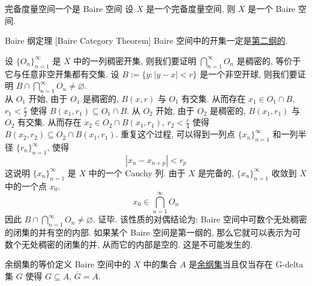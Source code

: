         \begin{thm}
            {完备度量空间一个是 Baire 空间}
            设 \(X\) 是一个完备度量空间, 则 \(X\) 是一个 Baire 空间.
        \end{thm}

        \begin{thm}
            [bct]
            {Baire 纲定理}
            [Baire Category Theorem]
            Baire 空间中的开集一定是\hyperref[dfn:second-category]{第二纲的}.
        \end{thm}

        \begin{prf}
            设 \(\{O_n\}_{n=1}^{\infty}\) 是 \(X\) 中的一列稠密开集, 则我们要证明 \(\bigcap_{n=1}^{\infty} O_n\) 是稠密的, 等价于它与任意非空开集都有交集. 设 \(B:=\{y:|y-x|<r\}\) 是一个非空开球, 则我们要证明 \(B\cap \bigcap_{n=1}^{\infty} O_n\neq \varnothing\). \\
            从 \(O_1\) 开始, 由于 \(O_1\) 是稠密的, \(B(x,r)\) 与 \(O_1\) 有交集. 从而存在 \(x_1\in O_1\cap B\), \(r_1<\frac{r}{2}\) 使得 \(B(x_1,r_1)\subseteq O_1\cap B\). 从 \(O_2\) 开始, 由于 \(O_2\) 是稠密的, \(B(x_1,r_1)\) 与 \(O_2\) 有交集. 从而存在 \(x_2\in O_2\cap B(x_1,r_1)\), \(r_2<\frac{r}{4}\) 使得 \(B(x_2,r_2)\subseteq O_2\cap B(x_1,r_1)\). 重复这个过程, 可以得到一列点 \(\{x_n\}_{n=1}^{\infty}\) 和一列半径 \(\{r_n\}_{n=1}^{\infty}\), 使得
            \[|x_n-x_{n+p}|<r_p\]
            这说明 \(\{x_n\}_{n=1}^{\infty}\) 是 \(X\) 中的一个 Cauchy 列. 由于 \(X\) 是完备的, \(\{x_n\}_{n=1}^{\infty}\) 收敛到 \(X\) 中的一个点 \(x_0\). 
            \[x_0\in \bigcap_{n=1}^{\infty} O_n\]
            因此 \(B\cap \bigcap_{n=1}^{\infty} O_n\neq \varnothing\). 证毕.
            \tcbline
            该性质的对偶结论为: Baire 空间中可数个无处稠密的闭集的并有空的内部. 如果某个 Baire 空间是第一纲的, 那么它就可以表示为可数个无处稠密的闭集的并, 从而它的内部是空的. 这是不可能发生的.
        \end{prf}

        \begin{ppt}
            {余纲集的等价定义}
            Baire 空间中的 \(X\) 中的集合 \(A\) 是\hyperref[dfn:residual]{余纲集}当且仅当存在 G-delta 集 \(G\) 使得 \(G\subseteq A\), \(\overline{G}=A\).
        \end{ppt}

